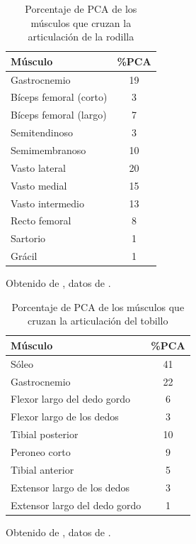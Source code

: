 \documentclass[12pt]{book}
\begin{document}
\begin{table}[htbp]
\centering
\caption{Porcentaje de PCA de los músculos que cruzan la articulación de la rodilla}
\label{tab:52}
\begin{tabularx}{0.6\textwidth}{Xc}
\toprule
\textbf{Músculo} & \textbf{\%PCA} \\
\midrule
Gastrocnemio & 19 \\
Bíceps femoral (corto) & 3 \\
Bíceps femoral (largo) & 7 \\
Semitendinoso & 3 \\
Semimembranoso & 10 \\
Vasto lateral & 20 \\
Vasto medial & 15 \\
Vasto intermedio & 13 \\
Recto femoral & 8 \\
Sartorio & 1 \\
Grácil & 1 \\
\bottomrule
\end{tabularx}
\begin{flushleft}
    \small Obtenido de \cite{81}, datos de \cite{76}.
\end{flushleft}
\end{table}

\begin{table}[htbp]
\centering
\caption{Porcentaje de PCA de los músculos que cruzan la articulación del tobillo}
\label{tab:53}
\begin{tabularx}{0.6\textwidth}{Xc}
\toprule
\textbf{Músculo} & \textbf{\%PCA} \\
\midrule
Sóleo & 41 \\
Gastrocnemio & 22 \\
Flexor largo del dedo gordo & 6 \\
Flexor largo de los dedos & 3 \\
Tibial posterior & 10 \\
Peroneo corto & 9 \\
Tibial anterior & 5 \\
Extensor largo de los dedos & 3 \\
Extensor largo del dedo gordo & 1 \\
\bottomrule
\end{tabularx}
\begin{flushleft}
    \small Obtenido de \cite{81}, datos de \cite{76}.
\end{flushleft}
\end{table}
\end{document}

